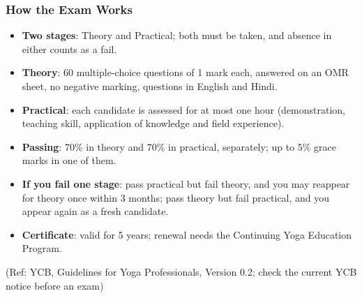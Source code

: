 \begin{frame}[fragile]\frametitle{How the Exam Works}
\begin{itemize}
\item \textbf{Two stages}: Theory and Practical; both must be taken, and absence in either counts as a fail.
\item \textbf{Theory}: 60 multiple-choice questions of 1 mark each, answered on an OMR sheet, no negative marking, questions in English and Hindi.
\item \textbf{Practical}: each candidate is assessed for at most one hour (demonstration, teaching skill, application of knowledge and field experience).
\item \textbf{Passing}: 70\% in theory and 70\% in practical, separately; up to 5\% grace marks in one of them.
\item \textbf{If you fail one stage}: pass practical but fail theory, and you may reappear for theory once within 3 months; pass theory but fail practical, and you appear again as a fresh candidate.
\item \textbf{Certificate}: valid for 5 years; renewal needs the Continuing Yoga Education Program.
\end{itemize}
{\tiny (Ref: YCB, Guidelines for Yoga Professionals, Version 0.2; check the current YCB notice before an exam)}
\end{frame}